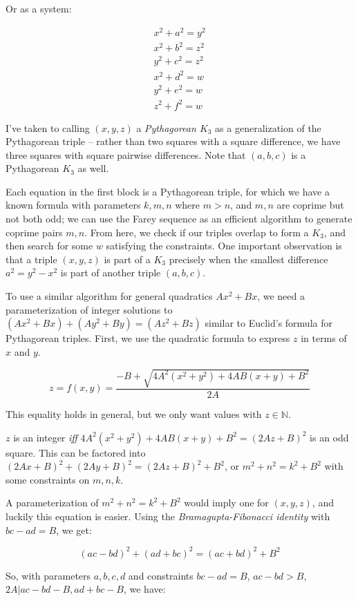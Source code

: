 \documentclass[a4paper]{amsproc}
\theoremstyle{plain}
\theoremstyle{named}
\newcommand{\N} {\mathbb{N}}
\begin{document}
Or as a system:

$$
\begin{matrix}
x^2 + a^2 = y^2 \\
x^2 + b^2 = z^2 \\
y^2 + c^2 = z^2 \\
x^2 + d^2 = w \\
y^2 + e^2 = w \\
z^2 + f^2 = w
\end{matrix}
$$

I've taken to calling $(x,y,z)$ a \textit{Pythagorean $K_3$} as a generalization of the Pythagorean triple --
rather than two squares with a square difference, we have three squares with square pairwise differences.
Note that $(a,b,c)$ is a Pythagorean $K_3$ as well.

Each equation in the first block is a Pythagorean triple, for which we have a known formula with parameters $k,m,n$ where $m > n$, and $m,n$ are coprime but not both odd;
we can use the Farey sequence as an efficient algorithm to generate coprime pairs $m,n$.
From here, we check if our triples overlap to form a $K_3$, and then search for some $w$ satisfying the constraints.
One important observation is that a triple $(x,y,z)$ is part of a $K_3$ precisely when the smallest difference $a^2 = y^2 - x^2$ is part of another
triple $(a,b,c)$.

To use a similar algorithm for general quadratics $Ax^2+Bx$, we need a parameterization of integer solutions to $(Ax^2+Bx) + (Ay^2+By) = (Az^2+Bz)$
similar to Euclid's formula for Pythagorean triples.
First, we use the quadratic formula to express $z$ in terms of $x$ and $y$.

$$z = f(x,y) = \frac{-B+\sqrt{4A^2(x^2+y^2)+4AB(x+y)+B^2}}{2A}$$

This equality holds in general, but we only want values with $z\in\N$.

$z$ is an integer \textit{iff} $4A^2(x^2+y^2)+4AB(x+y)+B^2=(2Az+B)^2$ is an odd square.
This can be factored into $(2Ax+B)^2+(2Ay+B)^2=(2Az+B)^2+B^2$, or $m^2+n^2=k^2+B^2$ with some constraints on $m,n,k$.

A parameterization of $m^2+n^2=k^2+B^2$ would imply one for $(x,y,z)$, and luckily this equation is easier.
Using the \textit{Bramagupta-Fibonacci identity} with ${bc-ad=B}$, we get:

$$(ac-bd)^2 + (ad+bc)^2 = (ac+bd)^2 + B^2$$

So, with parameters $a,b,c,d$ and constraints $bc-ad=B$, $ac-bd> B$, ${2A\vert ac-bd-B}, ad+bc-B$, we have:
\end{document}
